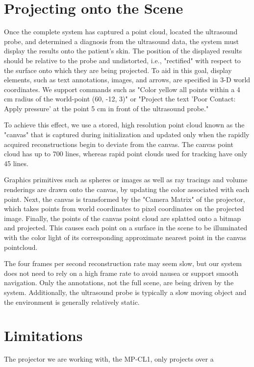 \documentclass{llncs}
\begin{document}
\section{Projecting onto the Scene}

Once the complete system has captured a point cloud, located the ultrasound probe, and determined a diagnosis from the ultrasound data, the system must display the results onto the patient's skin. The position of the displayed results should be relative to the probe and undistorted, i.e., "rectified" with respect to the surface onto which they are being projected. To aid in this goal, display elements, such as text annotations, images, and arrows, are specified in 3-D world coordinates. We support commands such as "Color yellow all points within a 4 cm radius of the world-point (60, -12, 3)" or "Project the text 'Poor Contact: Apply pressure' at the point 5 cm in front of the ultrasound probe."

To achieve this effect, we use a stored, high resolution point cloud known as the "canvas" that is captured during initialization and updated only when the rapidly acquired reconstructions begin to deviate from the canvas. The canvas point cloud has up to 700 lines, whereas rapid point clouds used for tracking have only 45 lines. 

Graphics primitives such as spheres or images as well as ray tracings and volume renderings are drawn onto the canvas, by updating the color associated with each point. Next, the canvas is transformed by the "Camera Matrix" of the projector, which takes points from world coordinates to pixel coordinates on the projected image. Finally, the points of the canvas point cloud are splatted onto a bitmap and projected. This causes each point on a surface in the scene to be illuminated with the color light of its corresponding approximate nearest point in the canvas pointcloud. 

The four frames per second reconstruction rate may seem slow, but our system does not need to rely on a high frame rate to avoid nausea or support smooth navigation. Only the annotations, not the full scene, are being driven by the system. Additionally, the ultrasound probe is typically a slow moving object and the environment is generally relatively static.

\section{Limitations}
The projector we are working with, the MP-CL1, only projects over a 
\end{document}
